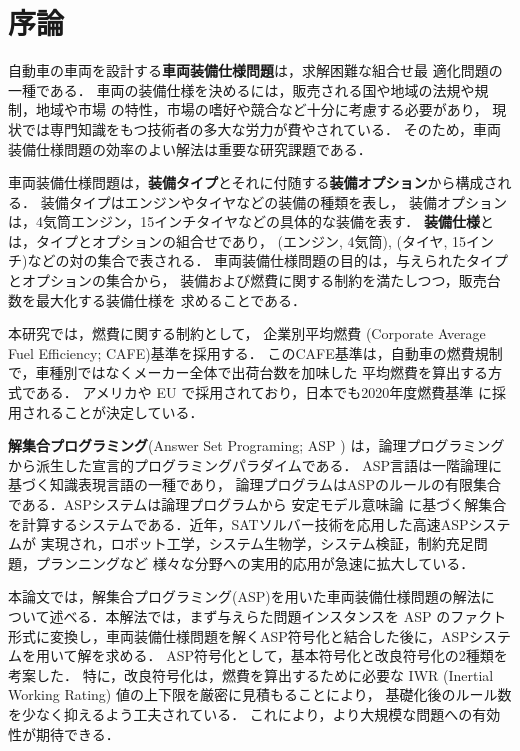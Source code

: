 \chapter{序論}
自動車の車両を設計する\textbf{車両装備仕様問題}は，求解困難な組合せ最
適化問題の一種である．
%
車両の装備仕様を決めるには，販売される国や地域の法規や規制，地域や市場
の特性，市場の嗜好や競合など十分に考慮する必要があり，
現状では専門知識をもつ技術者の多大な労力が費やされている．
そのため，車両装備仕様問題の効率のよい解法は重要な研究課題である．

車両装備仕様問題は，\textbf{装備タイプ}とそれに付随する\textbf{装備オプション}から構成される．
装備タイプはエンジンやタイヤなどの装備の種類を表し，
装備オプションは，4気筒エンジン，15インチタイヤなどの具体的な装備を表す．
%
\textbf{装備仕様}とは，タイプとオプションの組合せであり，
(エンジン, 4気筒), (タイヤ, 15インチ)などの対の集合で表される．
車両装備仕様問題の目的は，与えられたタイプとオプションの集合から，
装備および燃費に関する制約を満たしつつ，販売台数を最大化する装備仕様を
求めることである．

本研究では，燃費に関する制約として，
企業別平均燃費 (Corporate Average Fuel Efficiency; CAFE)基準を採用する．
このCAFE基準は，自動車の燃費規制で，車種別ではなくメーカー全体で出荷台数を加味した
平均燃費を算出する方式である．
アメリカや EU で採用されており，日本でも2020年度燃費基準 に採用されることが決定している．

\textbf{解集合プログラミング}(Answer Set Programing; ASP \cite{%
  Baral03:cambridge,%
  Gelfond88:iclp, %
  Inoue08:jssst})
は，論理プログラミングから派生した宣言的プログラミングパラダイムである．
ASP言語は一階論理に基づく知識表現言語の一種であり，
論理プログラムはASPのルールの有限集合である．ASPシステムは論理プログラムから
安定モデル意味論 \cite{Gelfond88:iclp}
に基づく解集合を計算するシステムである．近年，SATソルバー技術を応用した高速ASPシステムが
実現され，ロボット工学，システム生物学，システム検証，制約充足問題，プランニングなど
様々な分野への実用的応用が急速に拡大している\cite{Gelfond16:aim}．

本論文では，解集合プログラミング(ASP)を用いた車両装備仕様問題の解法に
ついて述べる．本解法では，まず与えらた問題インスタンスを ASP のファクト
形式に変換し，車両装備仕様問題を解くASP符号化と結合した後に，ASPシステ
ムを用いて解を求める．
ASP符号化として，基本符号化と改良符号化の2種類を考案した．
特に，改良符号化は，燃費を算出するために必要な
IWR (Inertial Working Rating) 値の上下限を厳密に見積もることにより，
基礎化後のルール数を少なく抑えるよう工夫されている．
これにより，より大規模な問題への有効性が期待できる．


